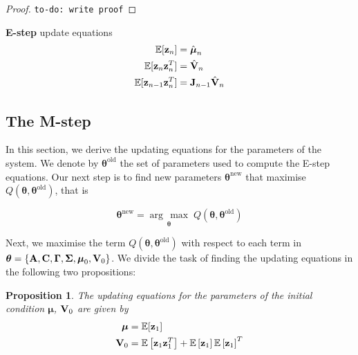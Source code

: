 \documentclass[11pt]{article}
\numberwithin{equation}{section}
\newcommand{\argmax}[1]{\underset{#1}{\operatorname{arg}\,\operatorname{max}}\;}
\newcommand{\expectation}[1]{\mathbb{E}\left[#1\right]}
\newcommand{\z}{{\bf z}}
\newtheorem{proposition}{Proposition}[section]
\begin{document}
\begin{proof}
	\texttt{to-do: write proof}
\end{proof}

\begin{tcolorbox}
\textbf{E-step} update equations
\begin{align}
	\mathbb{E}[\z_n] &= \hat{\boldsymbol{\mu}}_n\\
	\mathbb{E}[\z_n \z_n^T] &= \hat{{\bf V}}_n\\
	\mathbb{E}[\z_{n-1}\z_n^T] &= {\bf J}_{n-1}\hat{\bf V}_n
\end{align}
\end{tcolorbox}


\subsection{The M-step}
In this section, we derive the updating equations for the parameters of the system. We denote by $\boldsymbol{\theta}^\text{old}$ the set of parameters used to compute the E-step equations. Our next step is to find new parameters $\boldsymbol{\theta}^\text{new}$ that maximise $Q(\boldsymbol\theta, \boldsymbol\theta^\text{old})$, that is

\begin{equation}
	\boldsymbol{\theta}^\text{new} = \argmax{\boldsymbol\theta} Q(\boldsymbol\theta, \boldsymbol\theta^\text{old})
\end{equation}

Next, we maximise the term $Q(\boldsymbol\theta, \boldsymbol\theta^\text{old})$ with respect to each term in $\boldsymbol\theta = \{{\bf A}, {\bf C}, \boldsymbol\Gamma, \boldsymbol\Sigma, \boldsymbol\mu_0, {\bf V}_0\}$. We divide the task of finding the updating equations in the following two propositions:

\begin{proposition}
	The updating equations for the parameters of the initial condition $\boldsymbol{\mu}$, ${\bf V}_0$ are given by
	\begin{align}
		\boldsymbol{\mu} &= \mathbb{E}[{\z_1}] \\
		{\bf V}_0 &= \expectation{\z_1 \z_1^T} + \expectation{\z_1}\expectation{\z_1}^T
	\end{align}
\end{proposition}
\end{document}
